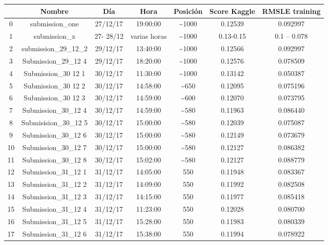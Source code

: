 	\begin{tabular}{ccccccc}
		\toprule
		{} &               Nombre &        Día &          Hora & Posición & Score Kaggle & RMSLE training \\
		\midrule
		0  &       submission\_one &   27/12/17 &      19:00:00 &    \textasciitilde1000 &      0.12539 &       0.092997 \\
		1  &         submission\_x &  27- 28/12 &  varias horas &    \textasciitilde1000 &    0.13-0.15 &    0.1 – 0.078 \\
		2  &   submission\_29\_12\_2 &   29/12/17 &      13:40:00 &    \textasciitilde1000 &      0.12566 &       0.092997 \\
		3  &   Submission\_29\_12 4 &   29/12/17 &      18:20:00 &    \textasciitilde1000 &      0.12576 &       0.078509 \\
		4  &   Submission\_30 12 1 &   30/12/17 &      11:30:00 &    \textasciitilde1000 &      0.13142 &       0.050387 \\
		5  &   Submission\_30 12 2 &   30/12/17 &      14:58:00 &     \textasciitilde650 &      0.12095 &       0.075196 \\
		6  &   Submission\_30 12 3 &   30/12/17 &      14:59:00 &     \textasciitilde600 &      0.12070 &       0.073795 \\
		7  &   Submission\_30\_12 4 &   30/12/17 &      14:59:00 &     \textasciitilde580 &      0.11963 &       0.086440 \\
		8  &  Submisision\_30\_12 5 &   30/12/17 &      15:00:00 &     \textasciitilde580 &      0.12039 &       0.075087 \\
		9  &   Submission\_30\_12 6 &   30/12/17 &      15:00:00 &     \textasciitilde580 &      0.12149 &       0.073679 \\
		10 &   Submission\_30\_12 7 &   30/12/17 &      15:00:00 &     \textasciitilde580 &      0.12127 &       0.086382 \\
		11 &   Submission\_30\_12 8 &   30/12/17 &      15:02:00 &     \textasciitilde580 &      0.12127 &       0.088779 \\
		12 &   Submission\_31\_12 1 &   31/12/17 &      14:05:00 &      550 &      0.11948 &       0.083367 \\
		13 &   Submission\_31\_12 2 &   31/12/17 &      14:09:00 &      550 &      0.11992 &       0.082508 \\
		14 &   Submission\_31\_12 3 &   31/12/17 &      14:15:00 &      550 &      0.11977 &       0.085418 \\
		15 &   Submission\_31\_12 4 &   31/12/17 &      11:23:00 &      550 &      0.12028 &       0.080700 \\
		16 &   Submission\_31\_12 5 &   31/12/17 &      15:28:00 &      550 &      0.11983 &       0.080339 \\
		17 &   Submission\_31\_12 6 &   31/12/17 &      15:38:00 &      550 &      0.11994 &       0.078922 \\
		\bottomrule
	\end{tabular}

